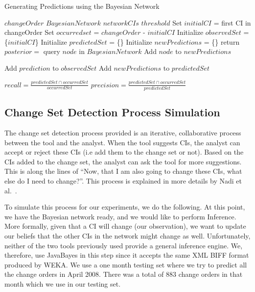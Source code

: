 \documentclass[10pt,twocolumn,letterpaper]{article}
\begin{document}
\begin{algorithm}[tb]
   \caption{Generating Predictions using the Bayesian Network}
   \label{alg:simulation}
\begin{algorithmic}
    $changeOrder$
     $BayesianNetwork$
 $networkCIs$ 
     $threshold$
    \STATE Set $initialCI$ = first CI in changeOrder
    \STATE Set $occurredset$ = $changeOrder$ - $initialCI$
    \STATE Initialize $observedSet$ = \{$initialCI$\}
    \STATE Initialize $predictedSet$ = \{\}
   \REPEAT  
    \STATE Initialize $newPredictions$ = \{\}
\STATE return 
\ENDIF
    \STATE $posterior =$ query $node$ in $BayesianNetwork$ 
      \STATE Add $node$ to $newPredictions$   
    \ENDIF
    \ENDFOR

      \STATE Add $prediction$ to $observedSet$
    \ENDIF
    \ENDFOR
\STATE Add $newPredictions$ to $predictedSet$

\newline
\STATE $recall=  \frac{predictedSet\cap occurredSet}{occurredSet}$
\newline
\STATE $precision = \frac{predictedSet\cap occurredSet}{predictedSet} $
\end{algorithmic}
\end{algorithm}

\subsection{Change Set Detection Process Simulation}

The change set detection process provided is an iterative, collaborative process between the tool and the analyst. When the tool suggests CIs, the analyst can
accept or reject these CIs (i.e add them to the change set or not). Based on the CIs added to the change set, the analyst can ask the tool for more
suggestions. This is along the lines of ``Now, that I am also going to change these CIs, what else do I need to change?''. This process is explained in more
details by Nadi et al.~\cite{nadi2010}.

To simulate this process for our experiments, we do the following. At this point, we have the Bayesian network ready, and we would like to perform Inference.
More formally, given that a CI will change (our observation), we want to update our beliefs that the other CIs in the network might change as well.
Unfortunately, neither of the two tools previously used provide a general inference engine. We, therefore, use JavaBayes in this step since it accepts
the same XML BIFF format produced by WEKA. We use a one month testing set where we try to predict all the change orders in April 2008. There was a total of
883 change orders in that month which we use in our testing set. 
\end{document}
